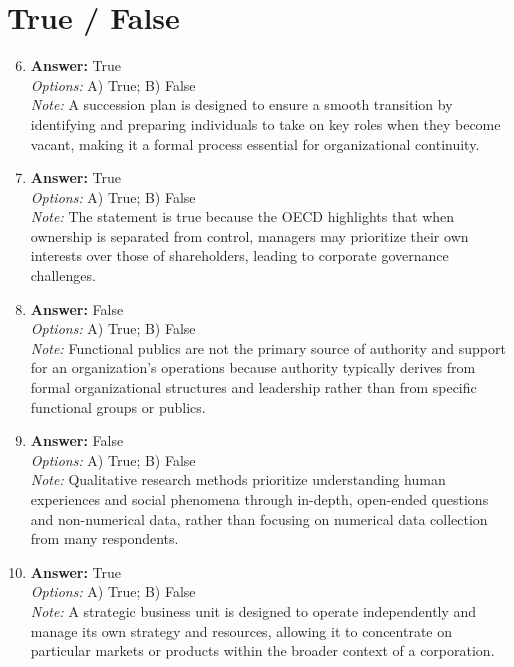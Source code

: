 \documentclass[12pt]{article}
\begin{document}
\section*{True / False}
\begin{enumerate}[label=\arabic*.]
\setcounter{enumi}{5}
\item \textbf{Answer:} True
\\ \textit{Options:} A) True; B) False
\\ \textit{Note:} A succession plan is designed to ensure a smooth transition by identifying and preparing individuals to take on key roles when they become vacant, making it a formal process essential for organizational continuity.
\item \textbf{Answer:} True
\\ \textit{Options:} A) True; B) False
\\ \textit{Note:} The statement is true because the OECD highlights that when ownership is separated from control, managers may prioritize their own interests over those of shareholders, leading to corporate governance challenges.
\item \textbf{Answer:} False
\\ \textit{Options:} A) True; B) False
\\ \textit{Note:} Functional publics are not the primary source of authority and support for an organization's operations because authority typically derives from formal organizational structures and leadership rather than from specific functional groups or publics.
\item \textbf{Answer:} False
\\ \textit{Options:} A) True; B) False
\\ \textit{Note:} Qualitative research methods prioritize understanding human experiences and social phenomena through in-depth, open-ended questions and non-numerical data, rather than focusing on numerical data collection from many respondents.
\item \textbf{Answer:} True
\\ \textit{Options:} A) True; B) False
\\ \textit{Note:} A strategic business unit is designed to operate independently and manage its own strategy and resources, allowing it to concentrate on particular markets or products within the broader context of a corporation.
\end{enumerate}
\end{document}
